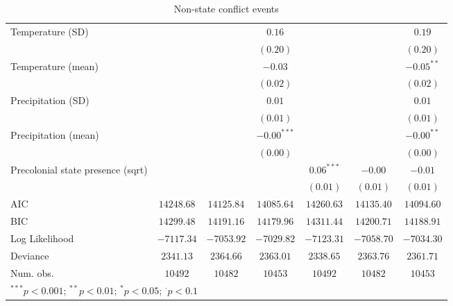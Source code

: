 \begin{sidewaystable}
\begin{center}
{\begin{tabular}{l c c c c c c}
Temperature (SD)                  &               &               & $0.16$        &               &               & $0.19$        \\
                                  &               &               & $(0.20)$      &               &               & $(0.20)$      \\
Temperature (mean)                &               &               & $-0.03$       &               &               & $-0.05^{**}$  \\
                                  &               &               & $(0.02)$      &               &               & $(0.02)$      \\
Precipitation (SD)                &               &               & $0.01$        &               &               & $0.01$        \\
                                  &               &               & $(0.01)$      &               &               & $(0.01)$      \\
Precipitation (mean)              &               &               & $-0.00^{***}$ &               &               & $-0.00^{**}$  \\
                                  &               &               & $(0.00)$      &               &               & $(0.00)$      \\
Precolonial state presence (sqrt) &               &               &               & $0.06^{***}$  & $-0.00$       & $-0.01$       \\
                                  &               &               &               & $(0.01)$      & $(0.01)$      & $(0.01)$      \\
\hline
AIC                               & $14248.68$    & $14125.84$    & $14085.64$    & $14260.63$    & $14135.40$    & $14094.60$    \\
BIC                               & $14299.48$    & $14191.16$    & $14179.96$    & $14311.44$    & $14200.71$    & $14188.91$    \\
Log Likelihood                    & $-7117.34$    & $-7053.92$    & $-7029.82$    & $-7123.31$    & $-7058.70$    & $-7034.30$    \\
Deviance                          & $2341.13$     & $2364.66$     & $2363.01$     & $2338.65$     & $2363.76$     & $2361.71$     \\
Num. obs.                         & $10492$       & $10482$       & $10453$       & $10492$       & $10482$       & $10453$       \\
\hline
\multicolumn{7}{l}{\scriptsize{$^{***}p<0.001$; $^{**}p<0.01$; $^{*}p<0.05$; $^{\cdot}p<0.1$}}
\end{tabular}
}
\caption{Non-state conflict events}
\label{non_state}
\end{center}
\end{sidewaystable}
